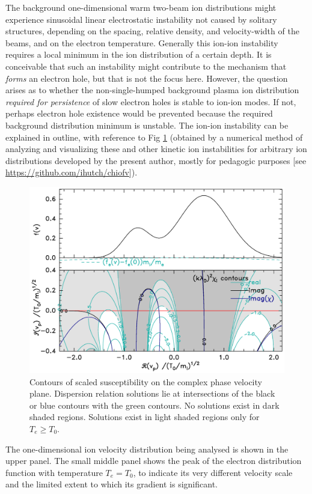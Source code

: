 \documentclass[12pt]{article}
\begin{document}
The background one-dimensional warm two-beam ion distributions might
experience sinusoidal linear electrostatic instability not caused by
solitary structures, depending on the spacing, relative density, and
velocity-width of the beams, and on the electron
temperature\cite{Stringer1964,Fried1966}. Generally this ion-ion
instability requires a local minimum in the ion distribution of a
certain depth. It is conceivable that such an instability might
contribute to the mechanism that \emph{forms} an electron hole, but
that is not the focus here. However, the question arises as to whether
the non-single-humped background plasma ion distribution
\emph{required for persistence} of slow electron holes is stable to
ion-ion modes. If not, perhaps electron hole existence would be
prevented because the required background distribution minimum is
unstable. The ion-ion instability can be explained in outline, with reference
to Fig \ref{fig:ionstability} (obtained by a numerical method of
analyzing and visualizing these and other kinetic ion instabilities
for arbitrary ion distributions developed by the present author,
mostly for pedagogic purposes [see
\url{https://github.com/ihutch/chiofv}]).
\begin{figure}[htp]
  \centering
  \includegraphics[width=.7\hsize]{ionstabplot}
  \caption{Contours of scaled susceptibility on the complex phase
    velocity plane. Dispersion relation solutions lie at
    intersections of the black or blue contours with the green
    contours. No solutions exist in dark shaded regions. Solutions
    exist in light shaded regions only for $T_e\ge T_0$.}
  \label{fig:ionstability}
\end{figure}
The one-dimensional ion velocity distribution being analysed is shown
in the upper panel. The small middle panel shows the peak of the
electron distribution function with temperature $T_e=T_0$, to indicate
its very different velocity scale and the limited extent to which its gradient
is significant. 
\end{document}
